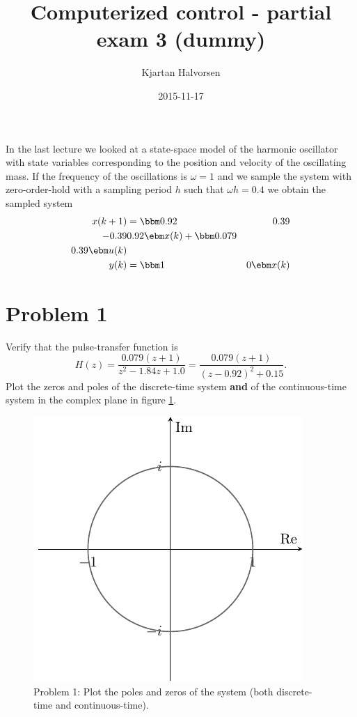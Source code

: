 \documentclass{scrartcl}
\title{Computerized control - partial exam 3 (dummy)}
\author{Kjartan Halvorsen}
\date{2015-11-17}
\begin{document}
\maketitle



In the last lecture we looked at a state-space model of the harmonic oscillator with state variables corresponding to the position and velocity of the oscillating mass. If the frequency of the oscillations is $\omega=1$ and we sample the system with zero-order-hold  with a sampling period $h$ such that $\omega h = 0.4$ we obtain the sampled system
\begin{equation}
\begin{split}
x(k+1) &= \bbm 0.92 & 0.39\\ -0.39 & 0.92 \ebm x(k) + \bbm 0.079\\0.39 \ebm u(k)\\
y(k)  &= \bbm 1 & 0 \ebm x(k)
\end{split}
\label{eq:ss}
\end{equation}

\section*{Problem 1}
\label{sec-1}

Verify that the pulse-transfer function is 
\begin{equation}
H(z) = \frac{0.079(z+1)}{z^2 - 1.84z + 1.0} = \frac{0.079(z+1)}{(z-0.92)^2 + 0.15}.
\end{equation}
Plot the zeros and poles of the discrete-time system \textbf{and} of the continuous-time system in the complex plane in figure \ref{fig:complex-plane}.
\begin{figure}[h]
\begin{center}
\includegraphics[]{complex-plane}
\caption{Problem 1: Plot the poles and zeros of the system (both discrete-time and continuous-time).}
\label{fig:complex-plane}
\end{center}
\end{figure}
\end{document}
